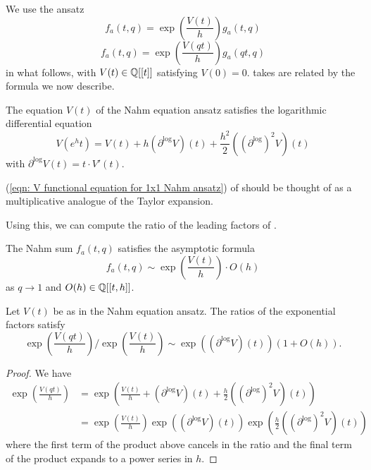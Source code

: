 We use the ansatz 
\begin{equation}\label{eqn: 1x1 Nahm sum ansatz}
    f_{a}(t,q)=\exp\left(\frac{V(t)}{h}\right)g_{a}(t,q)
\end{equation}
\begin{equation}\label{eqn: qt 1x1 Nahm sum ansatz}
    f_{a}(t,q)=\exp\left(\frac{V(qt)}{h}\right)g_{a}(qt,q)
\end{equation}
in what follows, with $V(t)\in\mathbb{Q}[[t]]$ satisfying $V(0)=0$.  takes are related by the formula we now describe. 
\begin{proposition}\label{prop: V functional equation for 1x1 Nahm ansatz}
    The equation $V(t)$ of the Nahm equation ansatz satisfies the logarithmic differential equation 
    \begin{equation}\label{eqn: V functional equation for 1x1 Nahm ansatz}
        V(e^{h}t) = V(t) + h(\partial^{\log}V)(t)+\frac{h^{2}}{2}((\partial^{\log})^{2}V)(t)
    \end{equation}
    with $\partial^{\log}V(t)=t\cdot V'(t)$.
\end{proposition}
\begin{remark}
    (\ref{eqn: V functional equation for 1x1 Nahm ansatz}) of  should be thought of as a multiplicative analogue of the Taylor expansion. 
\end{remark}
Using this, we can compute the ratio of the leading factors of . 
\begin{proposition}\label{prop: asymptotic expansion of modifed 1x1 Nahm sum at 1}
    The Nahm sum $f_{a}(t,q)$ satisfies the asymptotic formula 
    \begin{equation}\label{eqn: asymptotic expansion of modified 1x1 Nahm sum at 1}
        f_{a}(t,q)\sim\exp\left(\frac{V(t)}{h}\right)\cdot O(h)
    \end{equation}
    as $q\to 1$ and $O(h)\in\mathbb{Q}[[t,h]]$. 
\end{proposition}
\begin{corollary}\label{corr: exponent ratio for 1x1 Nahm sum antsatz}
    Let $V(t)$ be as in the Nahm equation ansatz. The ratios of the exponential factors satisfy 
    $$\exp\left(\frac{V(qt)}{h}\right)/\exp\left(\frac{V(t)}{h}\right)\sim\exp((\partial^{\log}V)(t))(1+O(h)).$$ 
\end{corollary}
\begin{proof}
    We have 
    \begin{align*}
        \exp\left(\frac{V(qt)}{h}\right) &= \exp\left(\frac{V(t)}{h}+(\partial^{\log}V)(t)+\frac{h}{2}((\partial^{\log})^{2}V)(t)\right)\\
        &=\exp\left(\frac{V(t)}{h}\right)\exp\left((\partial^{\log}V)(t)\right)\exp\left(\frac{h}{2}((\partial^{\log})^{2}V)(t)\right)
    \end{align*}
    where the first term of the product above cancels in the ratio and the final term of the product expands to a power series in $h$. 
\end{proof}
